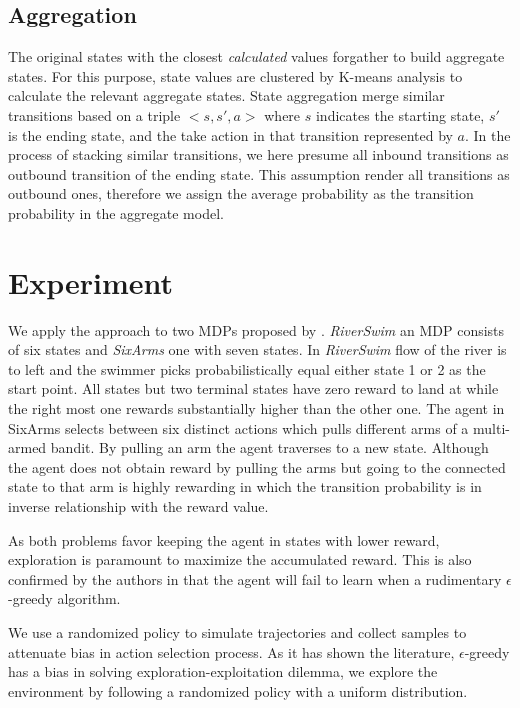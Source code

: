 \documentclass{article}
\begin{document}
    \subsection{Aggregation}
    The original states with the closest \textit{calculated} values forgather to build aggregate states.
    For this purpose, state values are clustered by K-means analysis to calculate the relevant aggregate states.
    State aggregation merge similar transitions based on a triple $<s, s', a>$ where $s$ indicates the starting state,
    $s'$ is the ending state, and the take action in that transition represented by $a$.
    In the process of stacking similar transitions, we here presume all inbound transitions as outbound transition of
    the ending state.
    This assumption render all transitions as outbound ones, therefore we assign the average probability as the
    transition probability in the aggregate model.


\section{Experiment}
    We apply the approach to two MDPs proposed by \cite{Strehl2004}.
    \textit{RiverSwim} an MDP consists of six states and \textit{SixArms} one with seven states.
    In \textit{RiverSwim} flow of the river is to left and the swimmer picks probabilistically equal either state 1
    or 2 as the start point.
    All states but two terminal states have zero reward to land at while the right most one rewards substantially
    higher than the other one.
    The agent in SixArms selects between six distinct actions which pulls different arms of a multi-armed bandit.
    By pulling an arm the agent traverses to a new state.
    Although the agent does not obtain reward by pulling the arms but going to the connected state to that arm is
    highly rewarding in which the transition probability is in inverse relationship with the reward value.

    As both problems favor keeping the agent in states with lower reward, exploration is paramount to maximize the
    accumulated reward.
    This is also confirmed by the authors in \cite{Strehl2004} that the agent will fail to learn when a rudimentary
    $\epsilon$-greedy algorithm.

    We use a randomized policy to simulate trajectories and collect samples to attenuate bias in action selection
    process.
    As it has shown the literature, $\epsilon$-greedy has a bias in solving exploration-exploitation dilemma, we
    explore the environment by following a randomized policy with a uniform distribution.
\end{document}
